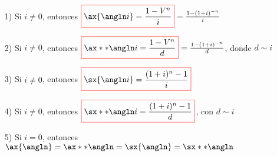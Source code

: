 \begin{proposition}
\hfill
\begin{enumerate}
\item[1)] Si $i \neq 0$, entonces
$\color{red}\boxed{\color{black}\ax{\angln i} = \frac{1-V^n}{i}} \color{black} = \frac{1-(1+i)^{-n}}{i}$
\item[2)] Si $i \neq 0$, entonces $\color{red}\boxed{\color{black}\ax**{\angln i} = \frac{1-V^n}{d}} \color{black} = \frac{1-(1+i)^{-n}}{d}$, donde $d \sim i$
\item[3)] Si $i \neq 0$, entonces $\color{red}\boxed{\color{black}\sx{\angln i} = \frac{(1+i)^n -1}{i}} \color{black}$
\item[4)] Si $i \neq 0$, entonces $\color{red}\boxed{\color{black}\sx**{\angln i} = \frac{(1+i)^n -1}{d}} \color{black}$, con $d\sim i$
\item[5)] Si $i = 0$, entonces $\ax{\angln} = \ax**{\angln} = \sx{\angln} = \sx**{\angln}$
\end{enumerate}
\end{proposition} 
